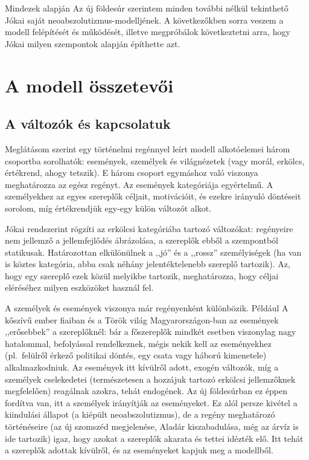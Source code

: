 \documentclass{thesis-ekf}
\begin{document}
    Mindezek alapján Az új földesúr szerintem minden további nélkül tekinthető Jókai saját neoabszolutizmus-modelljének.
    A következőkben sorra veszem a modell felépítését és működését, illetve megpróbálok következtetni arra,
        hogy Jókai milyen szempontok alapján építhette azt.


    \chapter{A modell összetevői}\label{ch:a-modell-osszetevoi}

    \section{A változók és kapcsolatuk}\label{sec:a-valtozok-es-kapcsolatuk}

    Meglátásom szerint egy történelmi regénnyel leírt modell alkotóelemei három csoportba sorolhatók:
        események, személyek és világnézetek (vagy morál, erkölcs, értékrend, ahogy tetszik).
    E három csoport egymáshoz való viszonya meghatározza az egész regényt.
    Az események kategóriája egyértelmű.
    A személyekhez az egyes szereplők céljait, motivációit, és ezekre irányuló döntéseit sorolom,
        míg értékrendjük egy-egy külön változót alkot.

    Jókai rendszerint rögzíti az erkölcsi kategóriába tartozó változókat:
        regényeire nem jellemző a jellemfejlődés ábrázolása, a szereplők ebből a szempontból statikusak.
    Határozottan elkülönülnek a ,,jó'' és a ,,rossz'' személyiségek (ha van is köztes kategória, abba csak néhány
        jelentéktelenebb szereplő tartozik).
    Az, hogy egy szereplő ezek közül melyikbe tartozik, meghatározza, hogy céljai eléréséhez milyen eszközöket használ fel.

    A személyek és események viszonya már regényenként különbözik.
    Például A kőszívű ember fiaiban és a Török világ Magyarországon-ban az események ,,erősebbek'' a szereplőknél:
        bár a főszereplők mindkét esetben viszonylag nagy hatalommal, befolyással rendelkeznek, mégis nekik kell az
        eseményekhez (pl.~felülről érkező politikai döntés, egy csata vagy háború kimenetele) alkalmazkodniuk.
    Az események itt kívülről adott, exogén változók, míg a személyek cselekedetei
        (természetesen a hozzájuk tartozó erkölcsi jellemzőknek megfelelően) reagálnak azokra, tehát endogének.
    Az új földesúrban ez éppen fordítva van, itt a személyek irányítják az eseményeket.
    Ez alól persze kivétel a kiindulási állapot (a kiépült neoabszolutizmus), de a regény meghatározó történéseire
        (az új szomszéd megjelenése, Aladár kiszabadulása, még az árvíz is ide tartozik) igaz,
        hogy azokat a szereplők akarata és tettei idézték elő.
    Itt tehát a szereplők adottak kívülről, és az eseményeket kapjuk meg a modellből.
\end{document}
